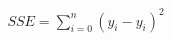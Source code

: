 \documentclass[10pt]{article}
\begin{document}
\begin{align*}SSE = {\sum\limits_{i=0}^n} (\hat{y_i} - y_i)^2\end{align*}
\end{document}
